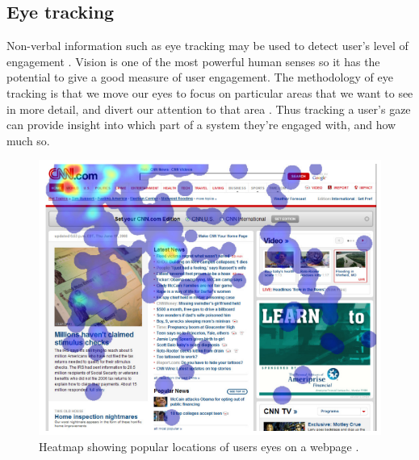 \documentclass{article}
\begin{document}


\subsection{Eye tracking}

Non-verbal information such as eye tracking may be used to detect user’s level of engagement \cite{lala2017detection}.
Vision is one of the most powerful human senses so it has the potential to give a good measure of user engagement. 
The methodology of eye tracking is that we move our eyes to focus on particular areas that we want to see in more detail, and divert our attention to that area \cite{duchowski2007eye}. 
Thus tracking a user’s gaze can provide insight into which part of a system they’re engaged with, and how much so.

\begin{figure}[ht!]
    \centering
    \centerline{
        \includegraphics[scale=0.8]{EyeHeatmap.PNG}
    }
    \caption{Heatmap showing popular locations of users eyes on a webpage \cite{buscher2009you}.}
    \label{fig:eyetrack}
\end{figure}
\end{document}

